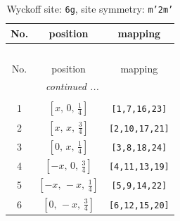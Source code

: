 \documentclass[fleqn,8pt]{jsarticle}
\begin{document}
\renewcommand{\arraystretch}{1.2}
\begin{longtable}{ccc}
\caption{Wyckoff site: {\tt 6g}, site symmetry: {\tt m'2m'}}
 \\
 \hline \hline
No. & position & mapping \\ \hline \endfirsthead

\multicolumn{2}{l}{\tablename\ \thetable{}} \\
 \hline \hline
No. & position & mapping \\ \hline \endhead

 \hline \hline
\multicolumn{2}{r}{\footnotesize\it continued ...} \\ \endfoot

 \hline \hline
\multicolumn{2}{r}{} \\ \endlastfoot

1 & $\left[ x,\, 0,\, \frac{1}{4} \right]$ & {\tt [1,7,16,23]} \\ \hline
2 & $\left[ x,\, x,\, \frac{3}{4} \right]$ & {\tt [2,10,17,21]} \\ \hline
3 & $\left[ 0,\, x,\, \frac{1}{4} \right]$ & {\tt [3,8,18,24]} \\ \hline
4 & $\left[ - x,\, 0,\, \frac{3}{4} \right]$ & {\tt [4,11,13,19]} \\ \hline
5 & $\left[ - x,\, - x,\, \frac{1}{4} \right]$ & {\tt [5,9,14,22]} \\ \hline
6 & $\left[ 0,\, - x,\, \frac{3}{4} \right]$ & {\tt [6,12,15,20]} \\
\end{longtable}
\renewcommand{\arraystretch}{1.2}
\end{document}
